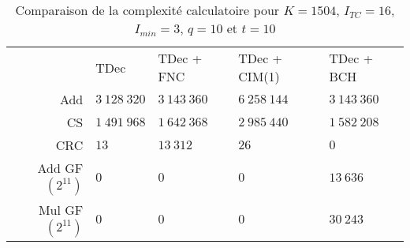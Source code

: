 \begin{table}[!t]
    \centering
    \caption{Comparaison de la complexité calculatoire pour les différentes approches de post-traitement des turbo codes, valeurs théoriques}
    \label{tab:cplx_soa_th}
\end{table}


\begin{table}[!t]
    \centering
    \caption{Comparaison de la complexité calculatoire pour $K=1504$, $I_{TC}=16$, $I_{min}=3$, $q=10$ et $t=10$ }
    \label{tab:cplx_soa}
        \begin{tabular}{rllll}
            \toprule
            		& TDec 			& TDec + FNC 	& TDec + CIM(1) & TDec + BCH \\
            \cmidrule(l){2-2}\cmidrule(l){3-3}\cmidrule(l){4-4}\cmidrule(l){5-5}
            Add 	& $3~128~320$ 	& $3~143~360$ 	& $6~258~144$ 	& $3~143~360$ \\
            CS  	& $1~491~968$ 	& $1~642~368$ 	& $2~985~440$ 	& $1~582~208$ \\
            CRC 	& $13$      	& $13~312$   	& $26$      	& $0$       \\
            Add GF$\left(2^{11}\right)$ & $0$ & $0$ &$0$			& $13~636$ \\
            Mul GF$\left(2^{11}\right)$ & $0$ & $0$ &$0$			& $30~243$ \\
            \bottomrule
        \end{tabular}%
\end{table}

